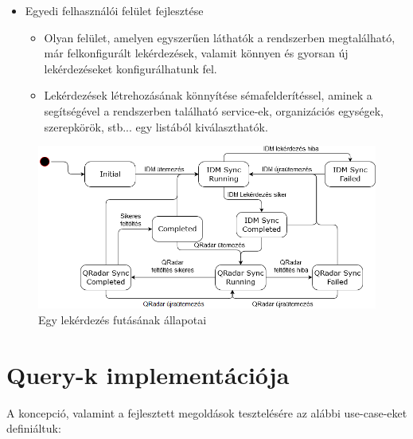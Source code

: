 \begin{itemize}
	\item Egyedi felhasználói felület fejlesztése
	\begin{itemize}
		\item Olyan felület, amelyen egyszerűen láthatók a rendszerben megtalálható, már felkonfigurált lekérdezések, valamit könnyen és gyorsan új lekérdezéseket konfigurálhatunk fel.
		\item Lekérdezések létrehozásának könnyítése sémafelderítéssel, aminek a segítségével a rendszerben található service-ek, organizációs egységek, szerepkörök, stb... egy listából kiválaszthatók.
	\end{itemize}
\end{itemize}

\begin{figure}
	\centering
	\includegraphics[width=0.9\linewidth]{figures/refloader_states}
	\caption{Egy lekérdezés futásának állapotai}
	\label{fig:refloaderstates}
\end{figure}


\section{Query-k implementációja} \label{sec:queryk}
A koncepció, valamint a fejlesztett megoldások tesztelésére az alábbi use-case-eket definiáltuk:

